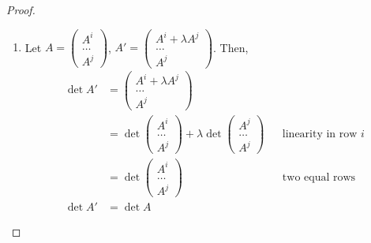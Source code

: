 \documentclass[letterpaper,12pt]{article}
\begin{document}
\begin{proof}
\begin{enumerate}
    \item Let $A = \begin{pmatrix} A^i \\ \dots \\ A^j \end{pmatrix}$, $A' = \begin{pmatrix} A^i + \lambda A^j \\ \dots \\ A^j \end{pmatrix}$. Then,
    \begin{align*}
        \det{A'} & = \begin{pmatrix} A^i + \lambda A^j \\ \dots \\ A^j \end{pmatrix} \\
        & = \det{\begin{pmatrix} A^i \\ \dots \\ A^j \end{pmatrix}} + \lambda \det{\begin{pmatrix} A^j \\ \dots \\ A^j \end{pmatrix}} && \text{linearity in row $i$} \\
        & = \det{\begin{pmatrix} A^i \\ \dots \\ A^j \end{pmatrix}} && \text{two equal rows} \\
        \det{A'} & = \det{A}
    \end{align*}
\end{enumerate}
\end{proof}
\end{document}
